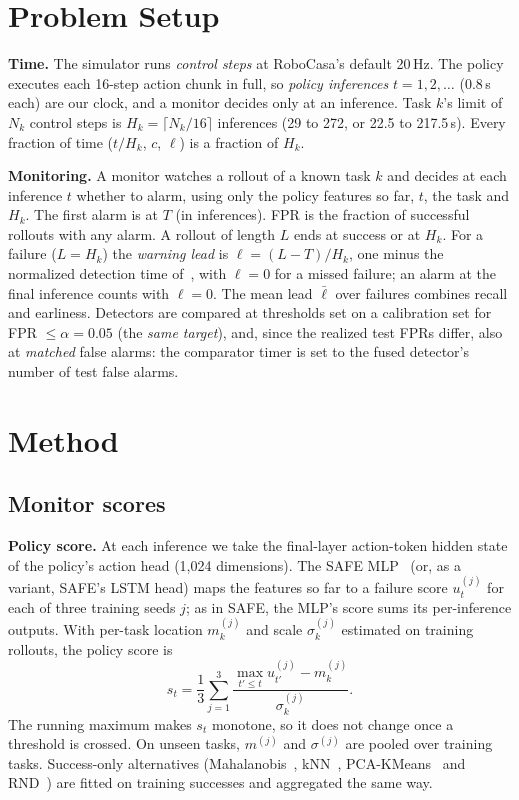 \documentclass[conference]{IEEEtran}
\begin{document}


\section{Problem Setup}
\label{sec:setting}

\textbf{Time.} The simulator runs \emph{control steps} at RoboCasa's default 20\,Hz. The policy
executes each 16-step action chunk in full, so \emph{policy inferences} $t = 1, 2, \dots$
(0.8\,s each) are our clock, and a monitor decides only at an inference. Task $k$'s limit of
$N_k$ control steps is $H_k = \lceil N_k/16 \rceil$ inferences (29 to 272, or 22.5 to 217.5\,s).
Every fraction of time ($t/H_k$, $c$, $\ell$) is a fraction of $H_k$.

\textbf{Monitoring.} A monitor watches a rollout of a known task $k$ and decides at each
inference $t$ whether to alarm, using only the policy features so far, $t$, the task and $H_k$.
The first alarm is at $T$ (in inferences). FPR is the fraction of successful rollouts with any
alarm. A rollout of length $L$ ends at success or at $H_k$. For a failure ($L = H_k$) the
\emph{warning lead} is $\ell = (L - T)/H_k$, one minus the normalized detection time
of~\cite{romer2025fiper}, with $\ell = 0$ for a missed failure; an alarm at the final inference
counts with $\ell = 0$. The mean lead $\bar\ell$ over failures combines recall and earliness.
Detectors are compared at thresholds set on a calibration set for FPR $\le \alpha = 0.05$ (the
\emph{same target}), and, since the realized test FPRs differ, also at \emph{matched} false
alarms: the comparator timer is set to the fused detector's number of test false alarms.

\section{Method}
\label{sec:method}

\subsection{Monitor scores}

\textbf{Policy score.} At each inference we take the final-layer action-token hidden state of
the policy's action head (1,024 dimensions). The SAFE MLP~\cite{gu2025safe} (or, as a variant, SAFE's
LSTM head) maps the features so far to a failure score $u^{(j)}_t$ for each of three training
seeds $j$; as in SAFE, the MLP's score sums its per-inference outputs. With per-task location $m^{(j)}_k$ and
scale $\sigma^{(j)}_k$ estimated on training rollouts, the policy score is
\begin{equation}
  s_t = \frac{1}{3}\sum_{j=1}^{3} \frac{\max_{t' \le t} u^{(j)}_{t'} - m^{(j)}_k}{\sigma^{(j)}_k}.
\end{equation}
The running maximum makes $s_t$ monotone, so it does not change once a threshold is crossed.
On unseen tasks, $m^{(j)}$ and $\sigma^{(j)}$ are pooled over training tasks.
Success-only alternatives (Mahalanobis~\cite{lee2018mahalanobis}, kNN~\cite{sun2022knn},
PCA-KMeans~\cite{liu2024siriusfleet} and RND~\cite{burda2019rnd,he2024rediffuser}) are fitted on
training successes and aggregated the same way.
\end{document}
